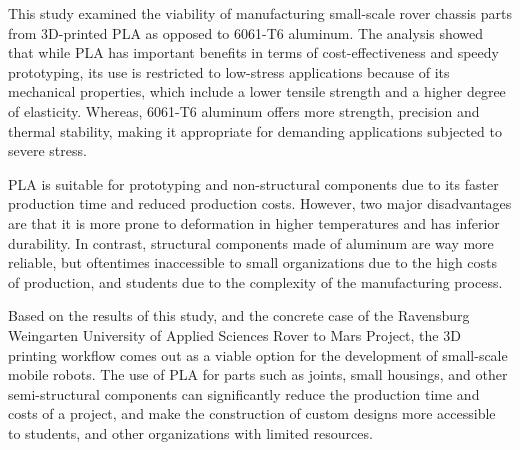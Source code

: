 This study examined the viability of manufacturing small-scale rover chassis parts from 3D-printed PLA as
opposed to 6061-T6 aluminum. The analysis showed that while PLA has important benefits in terms of
cost-effectiveness and speedy prototyping, its use is restricted to low-stress applications because of its
mechanical properties, which include a lower tensile strength and a higher degree of elasticity. Whereas,
6061-T6 aluminum offers more strength, precision and thermal stability, making it appropriate for
demanding applications subjected to severe stress.

PLA is suitable for prototyping and non-structural components due to its faster production time and
reduced production costs. However, two major disadvantages are that it is more prone to deformation in
higher temperatures and has inferior durability. In contrast, structural components made of aluminum are way more reliable, but oftentimes inaccessible to small organizations due to the high costs of production, and students due to the complexity of the manufacturing process.

Based on the results of this study, and the concrete case of the Ravensburg Weingarten University of Applied Sciences Rover to Mars Project, the 3D printing workflow comes out as a viable option for the development of small-scale mobile robots. The use of PLA for parts such as joints, small housings, and other semi-structural components can significantly reduce the production time and costs of a project, and make the construction of custom designs more accessible to students, and other organizations with limited resources.